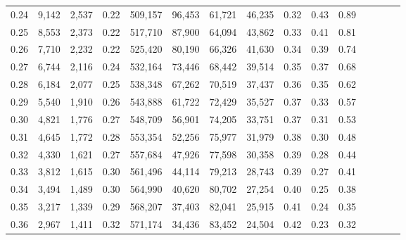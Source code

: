 \begin{tabular}{rrrcrrrrrrrrrrr}
0.24 &   9,142 &  2,537 &                                       0.22 &  509,157 &   96,453 &   61,721 &   46,235 &  0.32 &  0.43 &                         0.89 \\
0.25 &   8,553 &  2,373 &                                       0.22 &  517,710 &   87,900 &   64,094 &   43,862 &  0.33 &  0.41 &                         0.81 \\
0.26 &   7,710 &  2,232 &                                       0.22 &  525,420 &   80,190 &   66,326 &   41,630 &  0.34 &  0.39 &                         0.74 \\
0.27 &   6,744 &  2,116 &                                       0.24 &  532,164 &   73,446 &   68,442 &   39,514 &  0.35 &  0.37 &                         0.68 \\
0.28 &   6,184 &  2,077 &                                       0.25 &  538,348 &   67,262 &   70,519 &   37,437 &  0.36 &  0.35 &                         0.62 \\
0.29 &   5,540 &  1,910 &                                       0.26 &  543,888 &   61,722 &   72,429 &   35,527 &  0.37 &  0.33 &                         0.57 \\
0.30 &   4,821 &  1,776 &                                       0.27 &  548,709 &   56,901 &   74,205 &   33,751 &  0.37 &  0.31 &                         0.53 \\
0.31 &   4,645 &  1,772 &                                       0.28 &  553,354 &   52,256 &   75,977 &   31,979 &  0.38 &  0.30 &                         0.48 \\
0.32 &   4,330 &  1,621 &                                       0.27 &  557,684 &   47,926 &   77,598 &   30,358 &  0.39 &  0.28 &                         0.44 \\
0.33 &   3,812 &  1,615 &                                       0.30 &  561,496 &   44,114 &   79,213 &   28,743 &  0.39 &  0.27 &                         0.41 \\
0.34 &   3,494 &  1,489 &                                       0.30 &  564,990 &   40,620 &   80,702 &   27,254 &  0.40 &  0.25 &                         0.38 \\
0.35 &   3,217 &  1,339 &                                       0.29 &  568,207 &   37,403 &   82,041 &   25,915 &  0.41 &  0.24 &                         0.35 \\
0.36 &   2,967 &  1,411 &                                       0.32 &  571,174 &   34,436 &   83,452 &   24,504 &  0.42 &  0.23 &                         0.32 \\

\end{tabular}
